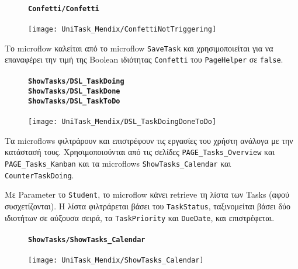                 \begin{figure}[H] \noindent
                    \paragraph{\texttt{Confetti/Confetti}}
                    \begin{center}
                        \texttt{[image: UniTask\_Mendix/ConfettiNotTriggering]}
                    \end{center}
                \end{figure}

                Το microflow καλείται από το microflow \texttt{SaveTask} και χρησιμοποιείται για να επαναφέρει την τιμή της Boolean ιδιότητας \texttt{Confetti} του \texttt{PageHelper} σε \texttt{false}.

                \begin{figure}[H] \noindent
                    \paragraph{\texttt{ShowTasks/DSL\_TaskDoing} \\ \texttt{ShowTasks/DSL\_TaskDone} \\ \texttt{ShowTasks/DSL\_TaskToDo}}
                    \begin{center}
                        \texttt{[image: UniTask\_Mendix/DSL\_TaskDoingDoneToDo]}
                    \end{center}
                \end{figure}

                Τα microflows φιλτράρουν και επιστρέφουν τις εργασίες του χρήστη ανάλογα με την κατάστασή τους. Χρησιμοποιούνται από τις σελίδες \texttt{PAGE\_Tasks\_Overview} και \texttt{PAGE\_Tasks\_Kanban} και τα microflows \texttt{ShowTasks\_Calendar} και \texttt{CounterTaskDoing}.

               Με Parameter το \texttt{Student}, το microflow κάνει retrieve τη λίστα των Tasks (αφού συσχετίζονται). Η λίστα φιλτράρεται βάσει του \texttt{TaskStatus}, ταξινομείται βάσει δύο ιδιοτήτων σε αύξουσα σειρά, τα \texttt{TaskPriority} και \texttt{DueDate}, και επιστρέφεται.

                \begin{figure}[H] \noindent
                    \paragraph{\texttt{ShowTasks/ShowTasks\_Calendar}}
                    \begin{center}
                        \texttt{[image: UniTask\_Mendix/ShowTasks\_Calendar]}
                    \end{center}
                \end{figure}


